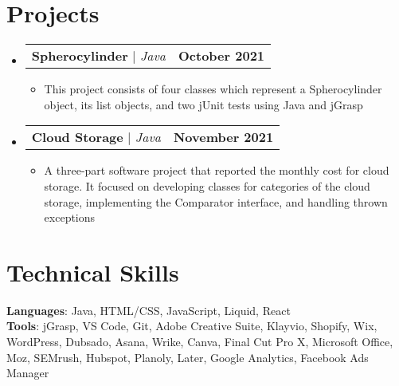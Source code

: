 \documentclass[letterpaper,11pt]{article}
\makeatletter
\newcommand{\resumeItem}[1]{
  \item\small{
    {#1 \vspace{-2pt}}
  }
}
\newcommand{\resumeProjectHeading}[2]{
    \item
    \begin{tabular*}{1.001\textwidth}{l@{\extracolsep{\fill}}r}
     \small#1 & \textbf{\small #2}\\
    \end{tabular*}\vspace{-7pt}
}
\newcommand{\resumeSubHeadingListStart}{\begin{itemize}[leftmargin=0.0in, label={}]}
\newcommand{\resumeSubHeadingListEnd}{\end{itemize}}
\newcommand{\resumeItemListStart}{\begin{itemize}}
\newcommand{\resumeItemListEnd}{\end{itemize}\vspace{-5pt}}
\makeatother
\begin{document}
\section{Projects}
    \vspace{-5pt}
    \resumeSubHeadingListStart
      \resumeProjectHeading
          {\textbf{Spherocylinder} $|$ \emph{Java}}{October 2021}
          \resumeItemListStart
            \resumeItem{This project consists of four classes which represent a Spherocylinder object, its list objects, and two jUnit tests using Java and jGrasp}
          \resumeItemListEnd
          \vspace{-13pt}
      \resumeProjectHeading
          {\textbf{Cloud Storage} $|$ \emph{Java}}{November 2021}
          \resumeItemListStart
            \resumeItem{A three-part software project that reported the monthly cost for cloud storage. It focused on developing classes for categories of the cloud storage, implementing the Comparator interface, and handling thrown exceptions}
          \resumeItemListEnd 
          \vspace{-13pt}
          
    \resumeSubHeadingListEnd
\vspace{-5pt}


%
\section{Technical Skills}
 \begin{itemize}[leftmargin=0.15in, label={}]
    \small{\item{
     \textbf{Languages}{: Java, HTML/CSS, JavaScript, Liquid, React} \\
     \textbf{Tools}{: jGrasp, VS Code, Git, Adobe Creative Suite, Klayvio, Shopify, Wix, WordPress, Dubsado, Asana, Wrike, Canva, Final Cut Pro X, Microsoft Office, Moz, SEMrush, Hubspot, Planoly, Later, Google Analytics, Facebook Ads Manager} \\
    }}
 \end{itemize}
 \vspace{-16pt}
\end{document}
